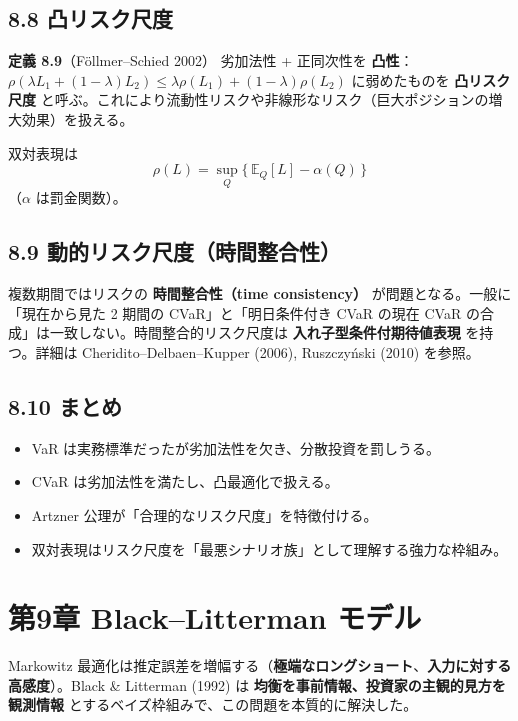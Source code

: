 \documentclass[11pt,a4paper]{report}
\begin{document}
\section{8.8 凸リスク尺度}

\textbf{定義 8.9}（Föllmer–Schied 2002） 劣加法性 + 正同次性を \textbf{凸性}：$\rho(\lambda L_1 + (1-\lambda) L_2) \le \lambda\rho(L_1) + (1-\lambda)\rho(L_2)$ に弱めたものを \textbf{凸リスク尺度} と呼ぶ。これにより流動性リスクや非線形なリスク（巨大ポジションの増大効果）を扱える。

双対表現は \[ \rho(L) = \sup_{Q} \{\, \mathbb{E}_Q[L] - \alpha(Q) \,\} \] （$\alpha$ は罰金関数）。

\section{8.9 動的リスク尺度（時間整合性）}

複数期間ではリスクの \textbf{時間整合性（time consistency）} が問題となる。一般に「現在から見た 2 期間の CVaR」と「明日条件付き CVaR の現在 CVaR の合成」は一致しない。時間整合的リスク尺度は \textbf{入れ子型条件付期待値表現} を持つ。詳細は Cheridito–Delbaen–Kupper (2006), Ruszczyński (2010) を参照。

\section{8.10 まとめ}

\begin{itemize}
\item VaR は実務標準だったが劣加法性を欠き、分散投資を罰しうる。
\item CVaR は劣加法性を満たし、凸最適化で扱える。
\item Artzner 公理が「合理的なリスク尺度」を特徴付ける。
\item 双対表現はリスク尺度を「最悪シナリオ族」として理解する強力な枠組み。
\end{itemize}

\noindent\hrulefill

\chapter{第9章 Black–Litterman モデル}

Markowitz 最適化は推定誤差を増幅する（\textbf{極端なロングショート}、\textbf{入力に対する高感度}）。Black \& Litterman (1992) は \textbf{均衡を事前情報、投資家の主観的見方を観測情報} とするベイズ枠組みで、この問題を本質的に解決した。
\end{document}
